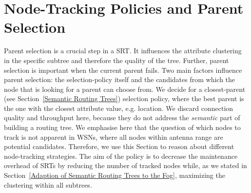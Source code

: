 \section{Node-Tracking Policies and Parent Selection}\label{Node-Tracking Policies}
  Parent selection is a crucial step in a SRT. It influences the attribute clustering in the specific subtree and therefore the quality of the tree. Further, parent selection is important when the current parent fails. Two main factors influence parent selection: the selection-policy itself and the candidates from which the node that is looking for a parent can choose from. We decide for a closest-parent (see Section~\ref{Semantic Routing Trees}) selection policy, where the best parent is the one with the closest attribute value, e.g. location. We discard connection quality and throughput here, because they do not address the \textit{semantic} part of building a routing tree. We emphasise here that the question of which nodes to track is not apparent in WSNs, where all nodes within antenna range are potential candidates. Therefore, we use this Section to reason about different node-tracking strategies. The aim of the policy is to decrease the maintenance overhead of SRTs by reducing the number of tracked nodes while, as we stated in Section~\ref{Adaption of Semantic Routing Trees to the Fog}, maximizing the clustering within all subtrees.
  
